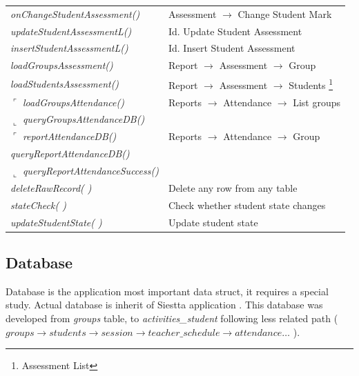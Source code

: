 \begin{bclogo}[couleur=orange!30,logo=\bcbook, arrondi=0.1,ombre=true ]
\begin{tabular}{ll}
\emph { onChangeStudentAssessment() }   & { Assessment  $\rightarrow$  Change Student Mark  } \\
\emph { updateStudentAssessmentL() }    & { Id.  Update Student Assessment} \\
\emph { insertStudentAssessmentL() }    &{  Id.  Insert Student Assessment }\\

\emph{ loadGroupsAssessment() }            & Report $\rightarrow$ Assessment $\rightarrow$  Group\\
\emph{ loadStudentsAssessment() }      & Report $\rightarrow$ Assessment $\rightarrow$   Students \footnote{Assessment List}\\

$\ulcorner$ \emph { loadGroupsAttendance()}         &{ Reports  $\rightarrow$ Attendance  $\rightarrow$ List  groups  } \\
$\llcorner$ \emph { queryGroupsAttendanceDB() }     &  \\

$\ulcorner$ \emph{ reportAttendanceDB()  }              & {  Reports $\rightarrow$  Attendance $\rightarrow$  Group }\\
\emph{ queryReportAttendanceDB() }          &  \\
$\llcorner$\emph{ queryReportAttendanceSuccess()}     &  \\

\emph { deleteRawRecord( ) }            & { Delete any row from any table } \\
\emph { stateCheck( )}                  &{ Check whether student state changes  }\\
\emph { updateStudentState( )}          &{ Update student state } \\

\end{tabular}
\end{bclogo}  
        
\subsection{Database}
Database is the application most important data struct, it requires a special study. Actual database
is inherit of Siestta application \cite{Siestta}. 
 This database was developed from \emph{groups} table,  to \emph{activities\_student} following less related 
 path ( $ groups \rightarrow students \rightarrow session \rightarrow teacher\_schedule \rightarrow attendance \dots $ ).

